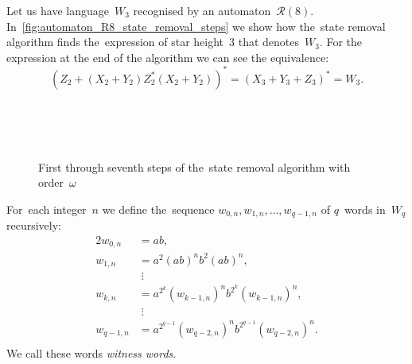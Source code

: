 \begin{example}
    Let us have language~$W_3$ recognised by an automaton~${\mathcal{R}(8)}$. In~\autoref*{fig:automaton_R8_state_removal_steps} we show how the~state removal algorithm finds the~expression of star height~$3$ that denotes~$W_3$. For the expression at the end of the algorithm we can see the equivalence:
    \[
        {(Z_2 + {(X_2 + Y_2)}Z_2^*{(X_2 + Y_2)})}^* = {(X_3 + Y_3 + Z_3)}^* = W_3.
    \]
\end{example}

\begin{figure}%
    \centering
    \hspace{-20pt}%
    \subfloat[][]{\label{fig:automaton_R8_state_removal_steps-a}%
        }%
    \hspace{70pt}%
    \subfloat[][]{\label{fig:automaton_R8_state_removal_steps-b}%
        }\\
    \subfloat[][]{\label{fig:automaton_R8_state_removal_steps-c}%
        }%
    \hspace{8pt}%
    \subfloat[][]{\label{fig:automaton_R8_state_removal_steps-d}%
        }\\
    \subfloat[][]{\label{fig:automaton_R8_state_removal_steps-e}%
        }\\
    \subfloat[][]{\label{fig:automaton_R8_state_removal_steps-f}%
        }%
    \hspace{40pt}%
    \subfloat[][]{\label{fig:automaton_R8_state_removal_steps-g}%
        }%
    \caption{First through seventh steps of the~state removal algorithm with order~$\omega$}\label{fig:automaton_R8_state_removal_steps}%
\end{figure}

\begin{defn}
    For~each integer~$n$ we define the~sequence $w_{0,n}, w_{1,n}, \dotsc , w_{q-1,n}$ of $q$~words in~$W_q$ recursively:
    \begin{alignat*}{2}
        w_{0,n} &= ab,\\
        w_{1,n} &= a^2{(ab)}^{n}b^2{(ab)}^{n},\\
                &\; \vdots \\
        w_{k,n} &= a^{2^k}{(w_{k-1,n})}^{n}b^{2^k}{(w_{k-1,n})}^{n},\\
                &\; \vdots \\
        w_{q-1,n} &= a^{2^{q-1}}{(w_{q-2,n})}^{n}b^{2^{q-1}}{(w_{q-2,n})}^{n}.\\
    \end{alignat*}
    We call these words \emph{witness words}.
\end{defn}

